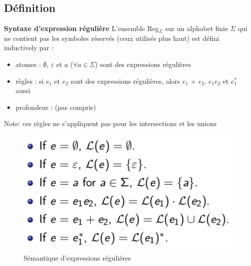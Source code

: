 \documentclass{article}
\begin{document}
\subsection{Définition}
\textbf{Syntaxe d'expression régulière}\newline
L'ensemble Reg$_{\Sigma}$ sur un alphabet finie $\Sigma$ qui ne contient pas les symboles réservés (ceux utilisés plus haut) est défini inductively par :
\begin{itemize}
    \item atomes : $\emptyset$, $\varepsilon$ et $a$ ($\forall a \in \Sigma$) sont des expressions régulières
    \item règles : si $e_{1}$ et $e_{2}$ sont des expressions régulières, alors $e_{1}$ + $e_{2}$, $e_{1}e_{2}$ et $e_{1}^{*}$ aussi
    \item profondeur : (pas compris)
\end{itemize}
Note: ces règles ne s'appliquent pas pour les intersections et les unions
\begin{figure}[h]
    \centering
    \includegraphics[scale=0.25]{Image2.png}
    \caption{Sémantique d'expressions régulières}
\end{figure}
\end{document}
